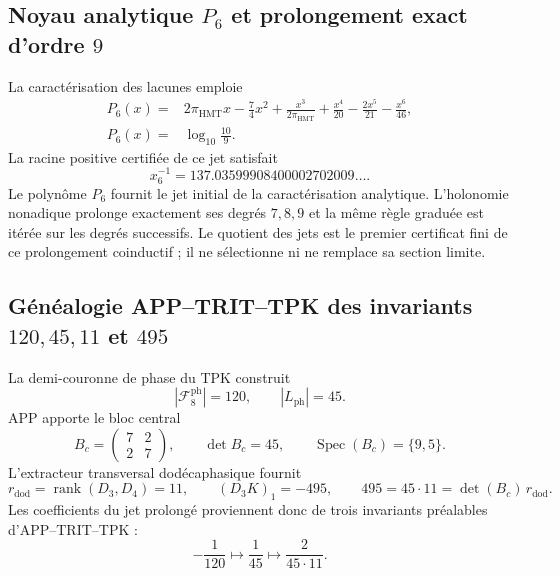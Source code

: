 \subsection{Noyau analytique \texorpdfstring{\(P_6\)}{P6} et prolongement exact d'ordre \texorpdfstring{\(9\)}{9}}
\label{sec:l9s102:alpha-p6}

La caractérisation des lacunes emploie
\begin{equation}
 \begin{aligned}
 P_6(x)={}&2\pi_{\mathrm{HMT}}x-\frac74x^2
 +\frac{x^3}{2\pi_{\mathrm{HMT}}}
 +\frac{x^4}{20}-\frac{2x^5}{21}-\frac{x^6}{46},\\
 P_6(x)={}&\log_{10}\frac{10}{9}.
 \end{aligned}
 \label{eq:l9s102:p6}
\end{equation}
La racine positive certifiée de ce jet satisfait
\begin{equation}
 x_6^{-1}=137.03599908400002702009\ldots .
 \label{eq:l9s102:raíz-p6}
\end{equation}
Le polynôme \(P_6\) fournit le jet initial de la caractérisation
analytique. L'holonomie nonadique prolonge exactement ses degrés \(7,8,9\) et
la même règle graduée est itérée sur les degrés successifs. Le quotient des
jets est le premier certificat fini de ce prolongement coinductif ; il ne
sélectionne ni ne remplace sa section limite.

\subsection{Généalogie APP--TRIT--TPK des invariants \texorpdfstring{\(120,45,11\)}{120, 45, 11} et \texorpdfstring{\(495\)}{495}}
\label{sec:l9s102:alpha-genealogia-7-9}

La demi-couronne de phase du TPK construit
\begin{equation}
 |\mathcal F_8^{\mathrm{ph}}|=120,
 \qquad |L_{\mathrm{ph}}|=45.
 \label{eq:l9s102:alpha-120-45}
\end{equation}
APP apporte le bloc central
\begin{equation}
 B_c=\begin{pmatrix}7&2\\2&7\end{pmatrix},
 \qquad
 \det B_c=45,
 \qquad
 \operatorname{Spec}(B_c)=\{9,5\}.
 \label{eq:l9s102:alpha-bc}
\end{equation}
L'extracteur transversal dodécaphasique fournit
\begin{equation}
 r_{\mathrm{dod}}=\operatorname{rank}(D_3,D_4)=11,
 \qquad
 (D_3K)_1=-495,
 \qquad
 495=45\cdot11=\det(B_c)\,r_{\mathrm{dod}}.
 \label{eq:l9s102:alpha-495}
\end{equation}
Les coefficients du jet prolongé proviennent donc de trois
invariants préalables d'APP--TRIT--TPK :
\begin{equation}
 -\frac1{120}\longmapsto\frac1{45}
 \longmapsto\frac2{45\cdot11}.
 \label{eq:l9s102:alpha-coeficientes}
\end{equation}

